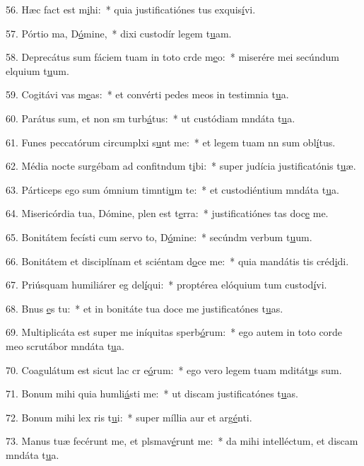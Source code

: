56. Hæc fact est m\uline{i}hi:~* quia justificatiónes tus exquis\uline{í}vi.\par 
57. Pórtio ma, D\uline{ó}mine,~* dixi custodír legem t\uline{u}am.\par 
58. Deprecátus sum fáciem tuam in toto crde m\uline{e}o:~* miserére mei secúndum elquium t\uline{u}um.\par 
59. Cogitávi vas m\uline{e}as:~* et convérti pedes meos in testimnia t\uline{u}a.\par 
60. Parátus sum, et non sm turb\uline{á}tus:~* ut custódiam mndáta t\uline{u}a.\par 
61. Funes peccatórum circumplxi s\uline{u}nt me:~* et legem tuam nn sum obl\uline{í}tus.\par 
62. Média nocte surgébam ad confitndum t\uline{i}bi:~* super judícia justificatónis t\uline{u}æ.\par 
63. Párticeps ego sum ómnium timnti\uline{u}m te:~* et custodiéntium mndáta t\uline{u}a.\par 
64. Misericórdia tua, Dómine, plen est t\uline{e}rra:~* justificatiónes tas doc\uline{e} me.\par 
65. Bonitátem fecísti cum servo to, D\uline{ó}mine:~* secúndm verbum t\uline{u}um.\par 
66. Bonitátem et disciplínam et sciéntam d\uline{o}ce me:~* quia mandátis tis créd\uline{i}di.\par 
67. Priúsquam humiliárer eg del\uline{í}qui:~* proptérea elóquium tum custod\uline{í}vi.\par 
68. Bnus \uline{e}s tu:~* et in bonitáte tua doce me justificatónes t\uline{u}as.\par 
69. Multiplicáta est super me iníquitas sperb\uline{ó}rum:~* ego autem in toto corde meo scrutábor mndáta t\uline{u}a.\par 
70. Coagulátum est sicut lac cr e\uline{ó}rum:~* ego vero legem tuam mditát\uline{u}s sum.\par 
71. Bonum mihi quia humli\uline{á}sti me:~* ut discam justificatónes t\uline{u}as.\par 
72. Bonum mihi lex ris t\uline{u}i:~* super míllia aur et arg\uline{é}nti.\par 
73. Manus tuæ fecérunt me, et plsmav\uline{é}runt me:~* da mihi intelléctum, et discam mndáta t\uline{u}a.\par 
